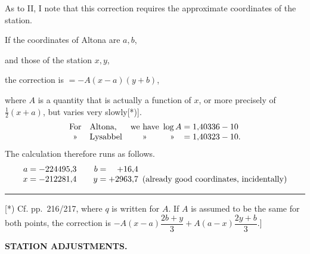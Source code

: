 As to II, I note that this correction requires the approximate coordinates of the station.

If the coordinates of Altona are \(a,b\),\par
and those of the station \(x,y\),\par
the correction is \(=-A(x-a)(y+b)\),\par
\noindent where \(A\) is a quantity that is actually a function of \(x\), or more precisely of \(\frac12(x+a)\), but varies very slowly[*)].
\[
\begin{array}{@{}c@{\quad}l@{\quad}c@{\enspace}c@{\;=\;}l@{}}
 \text{For}&\text{Altona,}&\text{we have}&\log A&1{,}40336-10\\
 \text{»}&\text{Lysabbel}&\text{»}&\text{»}&1{,}40323-10.
\end{array}
\]
\indent The calculation therefore runs as follows.
\[
\begin{array}{@{}r@{\;=\;}r@{\qquad}r@{\;=\;}r@{\enspace}l@{}}
 a&-224495{,}3&b&+16{,}4&\\
 x&-212281{,}4&y&+2963{,}7&\text{(already good coordinates, incidentally)}
\end{array}
\]

\par\smallskip\noindent\rule{4cm}{.4pt}\par
{\footnotesize\noindent\hspace*{\parindent}[*) Cf. pp.~216/217, where \(q\) is written for \(A\). If \(A\) is assumed to be the same for both points, the correction is \(-A(x-a)\dfrac{2b+y}{3}+A(a-x)\dfrac{2y+b}{3}\).]\par}

\par\clearpage
\noindent\null\hfill{\small\textbf{STATION ADJUSTMENTS.}}\hfill{}\par\medskip

